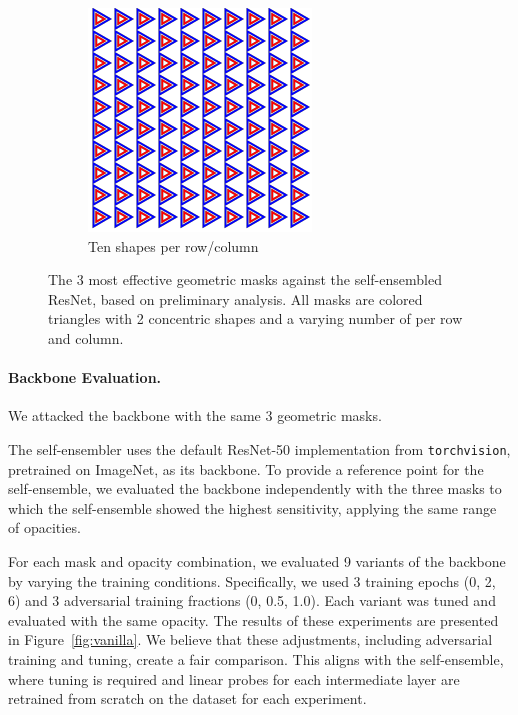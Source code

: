 \documentclass[a4paper, oneside]{discothesis}
\begin{document}
\begin{figure}[th]
	\hfill
	\begin{subfigure}[t]{0.19\textwidth}\centering\includegraphics[width=\linewidth]{figures/3_10_2_True.png}\caption{Ten shapes per row/column}\label{fig:atk7}\end{subfigure}

	\caption{The 3 most effective geometric masks against the self-ensembled ResNet, based on preliminary analysis. All masks are colored triangles with 2 concentric shapes and a varying number of per row and column.}
	\label{fig:attacks-v2-subset}
\end{figure}

\paragraph{Backbone Evaluation.}

We attacked the backbone with the same 3 geometric masks.

The self-ensembler uses the default ResNet-50 implementation from \texttt{torchvision}, pretrained on ImageNet, as its backbone. To provide a reference point for the self-ensemble, we evaluated the backbone independently with the three masks to which the self-ensemble showed the highest sensitivity, applying the same range of opacities.

For each mask and opacity combination, we evaluated 9 variants of the backbone by varying the training conditions. Specifically, we used 3 training epochs (0, 2, 6) and 3 adversarial training fractions (0, 0.5, 1.0). Each variant was tuned and evaluated with the same opacity. The results of these experiments are presented in Figure~\ref{fig:vanilla}. We believe that these adjustments, including adversarial training and tuning, create a fair comparison. This aligns with the self-ensemble, where tuning is required and linear probes for each intermediate layer are retrained from scratch on the dataset for each experiment. 
\end{document}
